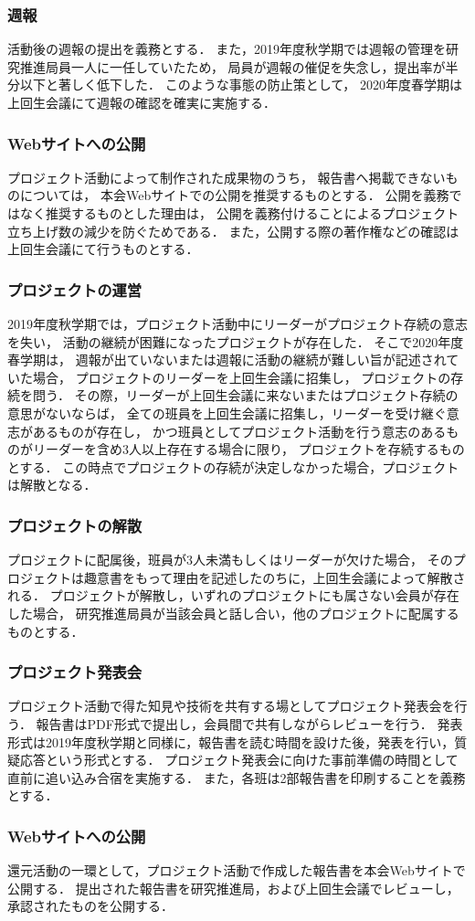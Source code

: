 \subsubsection*{週報}
活動後の週報の提出を義務とする．
また，2019年度秋学期では週報の管理を研究推進局員一人に一任していたため，
局員が週報の催促を失念し，提出率が半分以下と著しく低下した．
このような事態の防止策として，
2020年度春学期は上回生会議にて週報の確認を確実に実施する．

\subsubsection*{Webサイトへの公開}
プロジェクト活動によって制作された成果物のうち，
報告書へ掲載できないものについては，
本会Webサイトでの公開を推奨するものとする．
公開を義務ではなく推奨するものとした理由は，
公開を義務付けることによるプロジェクト立ち上げ数の減少を防ぐためである．
また，公開する際の著作権などの確認は上回生会議にて行うものとする．


\subsubsection*{プロジェクトの運営}
2019年度秋学期では，プロジェクト活動中にリーダーがプロジェクト存続の意志を失い，
活動の継続が困難になったプロジェクトが存在した．
そこで2020年度春学期は，
週報が出ていないまたは週報に活動の継続が難しい旨が記述されていた場合，
プロジェクトのリーダーを上回生会議に招集し，
プロジェクトの存続を問う．
その際，リーダーが上回生会議に来ないまたはプロジェクト存続の意思がないならば，
全ての班員を上回生会議に招集し，リーダーを受け継ぐ意志があるものが存在し，
かつ班員としてプロジェクト活動を行う意志のあるものがリーダーを含め3人以上存在する場合に限り，
プロジェクトを存続するものとする．
この時点でプロジェクトの存続が決定しなかった場合，プロジェクトは解散となる．

\subsubsection*{プロジェクトの解散}
プロジェクトに配属後，班員が3人未満もしくはリーダーが欠けた場合，
そのプロジェクトは趣意書をもって理由を記述したのちに，上回生会議によって解散される．
プロジェクトが解散し，いずれのプロジェクトにも属さない会員が存在した場合，
研究推進局員が当該会員と話し合い，他のプロジェクトに配属するものとする．

\subsubsection*{プロジェクト発表会}
プロジェクト活動で得た知見や技術を共有する場としてプロジェクト発表会を行う．
報告書はPDF形式で提出し，会員間で共有しながらレビューを行う．
発表形式は2019年度秋学期と同様に，報告書を読む時間を設けた後，発表を行い，質疑応答という形式とする．
プロジェクト発表会に向けた事前準備の時間として直前に追い込み合宿を実施する．
また，各班は2部報告書を印刷することを義務とする．

\subsubsection*{Webサイトへの公開}
還元活動の一環として，プロジェクト活動で作成した報告書を本会Webサイトで公開する．
提出された報告書を研究推進局，および上回生会議でレビューし，承認されたものを公開する．

